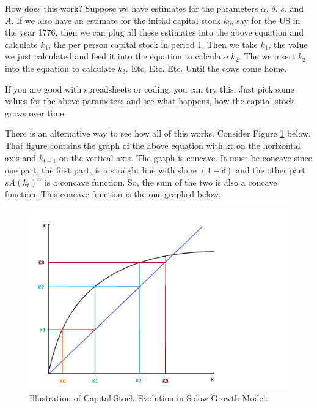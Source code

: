 \documentclass[
]{book}
\begin{document}
How does this work? Suppose we have estimates for the parameters \(\alpha\), \(\delta\), \(s\), and \(A\). If we also have an estimate for the initial capital stock \(k_0\), say for the US in the year 1776, then we can plug all these estimates into the above equation and calculate \(k_1\), the per person capital stock in period 1. Then we take \(k_1\), the value we just calculated and feed it into the equation to calculate \(k_2\). The we insert \(k_2\) into the equation to calculate \(k_3\).
Etc.
Etc.
Etc.
Until the cows come home.

If you are good with spreadsheets or coding, you can try this. Just pick some values for the above parameters and see what happens, how the capital stock grows over time.

There is an alternative way to see how all of this works. Consider Figure \ref{fig:fig104} below. That figure contains the graph of the above equation with kt on the horizontal axis and \(k_{t+1}\) on the vertical axis.
The graph is concave. It must be concave since one part, the first part, is a straight line with slope \((1 - \delta)\) and the other part \(sA(k_t)^\alpha\) is a concave function. So, the sum of the two is also a concave function. This concave function is the one graphed below.

\begin{figure}

{\centering \includegraphics[width=1\linewidth]{img/ch1/k3} 

}

\caption{Illustration of Capital Stock Evolution in Solow Growth Model.}\label{fig:fig104}
\end{figure}
\end{document}
